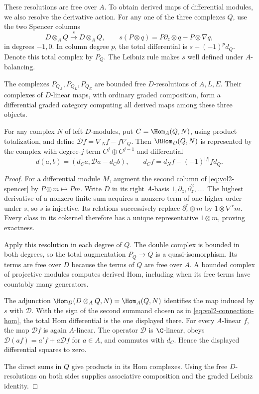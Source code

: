 These resolutions are free over $A$. To obtain derived maps of
differential modules, we also resolve the derivative action.
For any one of the three complexes $Q$, use the two Spencer columns
\begin{equation}\label{eq:vol2-spencer}
 D\otimes_A Q\xrightarrow{s}D\otimes_A Q,\qquad
 s(P\otimes q)=P\partial_z\otimes q-P\otimes\nabla q,
\end{equation}
in degrees $-1,0$. In column degree $p$, the total differential is
$s+(-1)^p d_Q$. Denote this total complex by $P_Q$.
The Leibniz rule makes $s$ well defined under $A$-balancing.

\begin{proposition}\label{prop:vol2-spencer-maps}
The complexes $P_{Q_A},P_{Q_L},P_{Q_E}$ are bounded free
$D$-resolutions of $A,L,E$. Their complexes of $D$-linear maps,
with ordinary graded composition, form a differential graded category
computing all derived maps among these three objects.

For any complex $N$ of left $D$-modules, put
$C=\Hom_A(Q,N)$, using product totalization, and define
$\mathcal Df=\nabla_Nf-f\nabla_Q$. Then $\RHom_D(Q,N)$ is represented
by the complex with degree-$j$ term $C^j\oplus C^{j-1}$ and differential
\begin{equation}\label{eq:vol2-connection-hom}
 d(a,b)=(d_Ca,\mathcal Da-d_Cb),\qquad
 d_Cf=d_Nf-(-1)^{|f|}fd_Q.
\end{equation}
\end{proposition}

\begin{proof}
For a differential module $M$, augment the second column of
\eqref{eq:vol2-spencer} by $P\otimes m\mapsto Pm$.
Write $D$ in its right $A$-basis $1,\partial_z,\partial_z^2,\ldots$.
The highest derivative of a nonzero finite sum acquires a nonzero
term of one higher order under $s$, so $s$ is injective.
Its relations successively replace $\partial_z^r\otimes m$ by
$1\otimes\nabla^r m$. Every class in its cokernel therefore has a
unique representative $1\otimes m$, proving exactness.

Apply this resolution in each degree of $Q$. The double complex
is bounded in both degrees, so the total augmentation $P_Q\to Q$
is a quasi-isomorphism. Its terms are free over $D$ because the
terms of $Q$ are free over $A$. A bounded complex of projective
modules computes derived Hom, including when its free terms have
countably many generators.

The adjunction
$\Hom_D(D\otimes_AQ,N)=\Hom_A(Q,N)$ identifies the map induced by
$s$ with $\mathcal D$. With the sign of the second summand chosen as
in \eqref{eq:vol2-connection-hom}, the total Hom differential is
the one displayed there. For every $A$-linear $f$, the map
$\mathcal Df$ is again $A$-linear. The operator $\mathcal D$ is
$\C$-linear, obeys $\mathcal D(af)=a'f+a\mathcal Df$ for $a\in A$,
and commutes with $d_C$. Hence the displayed differential squares
to zero.

The direct sums in $Q$ give products in its Hom complexes.
Using the free $D$-resolutions on both sides supplies associative
composition and the graded Leibniz identity.
\end{proof}

